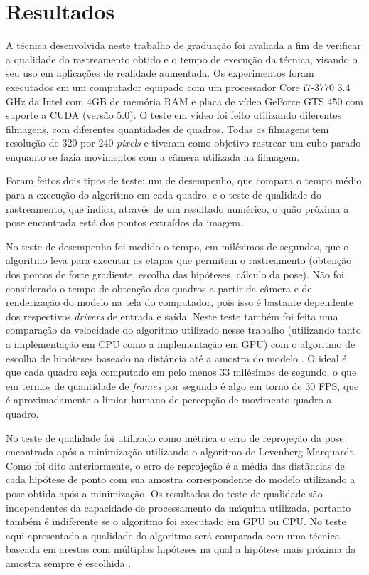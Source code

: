 \chapter{Resultados}
\label{chapter:resultados}

A técnica desenvolvida neste trabalho de graduação foi avaliada a fim de verificar a qualidade do rastreamento obtido e o tempo de execução da técnica, visando o seu uso em aplicações de realidade aumentada. Os experimentos foram executados em um computador equipado com um processador Core i7-3770 3.4 GHz da Intel com 4GB de memória RAM e placa de vídeo GeForce GTS 450 com suporte a CUDA (versão 5.0). O teste em vídeo foi feito utilizando diferentes filmagens, com diferentes quantidades de quadros. Todas as filmagens tem resolução de 320 por 240 \emph{pixels} e tiveram como objetivo rastrear um cubo parado enquanto se fazia movimentos com a câmera utilizada na filmagem.

Foram feitos dois tipos de teste: um de desempenho, que compara o tempo médio para a execução do algoritmo em cada quadro, e o teste de qualidade do rastreamento, que indica, através de um resultado numérico, o quão próxima a pose encontrada está dos pontos extraídos da imagem.

No teste de desempenho foi medido o tempo, em milésimos de segundos, que o algoritmo leva para executar as etapas que permitem o rastreamento (obtenção dos pontos de forte gradiente, escolha das hipóteses, cálculo da pose). Não foi considerado o tempo de obtenção dos quadros a partir da câmera e de renderização do modelo na tela do computador, pois isso é bastante dependente dos respectivos \emph{drivers} de entrada e saída. Neste teste também foi feita uma comparação da velocidade do algoritmo utilizado nesse trabalho (utilizando tanto a implementação em CPU como a implementação em GPU) com o algoritmo de escolha de hipóteses baseado na distância até a amostra do modelo \cite{mestradochico}. O ideal é que cada quadro seja computado em pelo menos 33 milésimos de segundo, o que em termos de quantidade de \emph{frames} por segundo é algo em torno de 30 FPS, que é aproximadamente o limiar humano de percepção de movimento quadro a quadro.

No teste de qualidade foi utilizado como métrica o erro de reprojeção da pose encontrada após a minimização utilizando o algoritmo de Levenberg-Marquardt. Como foi dito anteriormente, o erro de reprojeção é a média das distâncias de cada hipótese de ponto com sua amostra correspondente do modelo utilizando a pose obtida após a minimização. Os resultados do teste de qualidade são independentes da capacidade de processamento da máquina utilizada, portanto também é indiferente se o algoritmo foi executado em GPU ou CPU. No teste aqui apresentado a qualidade do algoritmo será comparada com uma técnica baseada em arestas com múltiplas hipóteses na qual a hipótese mais próxima da amostra sempre é escolhida \cite{mestradochico}.

